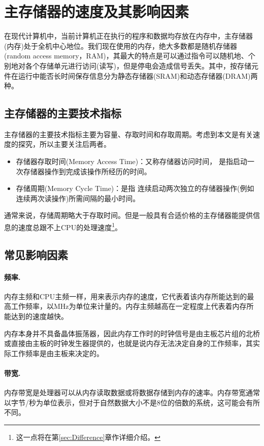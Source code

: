 \documentclass[final]{cvpr}
\newcommand{\mypara}[1]{\paragraph{#1.}}
\begin{document}
\section{主存储器的速度及其影响因素}\label{sec:RAM}

在现代计算机中，当前计算机正在执行的程序和数据均存放在内存中，主存储器(内存)处于全机中心地位。我们现在使用的内存，绝大多数都是随机存储器(random access memory，RAM)，其最大的特点是可以通过指令可以随机地、个别地对各个存储单元进行访问(读写)，但是停电会造成信号丢失。其中，按存储元件在运行中能否长时间保存信息分为静态存储器(SRAM)和动态存储器(DRAM)两种。

\subsection{\textbf{主存储器的主要技术指标}}

主存储器的主要技术指标主要为容量、存取时间和存取周期。考虑到本文是有关速度的探究，所以主要关注后两者。

\begin{itemize}
\item 存储器存取时间(Memory Access Time)：又称存储器访问时间，
是指启动一次存储器操作到完成该操作所经历的时间。
\item 存储周期(Memory Cycle Time)：是指
连续启动两次独立的存储器操作(例如连续两次读操作)所需间隔的最小时间。
\end{itemize}

通常来说，存储周期略大于存取时间。但是一般具有合适价格的主存储器能提供信息的速度总跟不上CPU的处理速度\footnote{这一点将在第\ref{sec:Difference}章作详细介绍。}。

\subsection{\textbf{常见影响因素}}

\mypara{频率}

内存主频和CPU主频一样，用来表示内存的速度，它代表着该内存所能达到的最高工作频率，以MHz为单位来计量的。内存主频越高在一定程度上代表着内存所能达到的速度越快。

内存本身并不具备晶体振荡器，因此内存工作时的时钟信号是由主板芯片组的北桥或直接由主板的时钟发生器提供的，也就是说内存无法决定自身的工作频率，其实际工作频率是由主板来决定的。

\mypara{带宽}

内存带宽是处理器可以从内存读取数据或将数据存储到内存的速率。内存带宽通常以字节/秒为单位表示，但对于自然数据大小不是8位的倍数的系统，这可能会有所不同。
\end{document}
